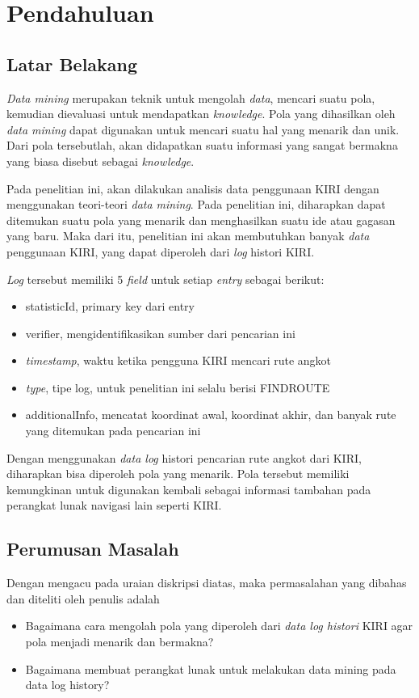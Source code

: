 \chapter{Pendahuluan}
\label{chap:intro}

\section{Latar Belakang}
\label{sec:motivation}

\textsl{Data mining} merupakan teknik untuk mengolah \textsl{data}, mencari suatu pola, kemudian dievaluasi untuk mendapatkan \textsl{knowledge}. Pola yang dihasilkan oleh \textsl{data mining} dapat digunakan untuk mencari suatu hal yang menarik dan unik. Dari pola tersebutlah, akan didapatkan suatu informasi yang sangat bermakna yang biasa disebut sebagai \textsl{knowledge}.

Pada penelitian ini, akan dilakukan analisis data penggunaan KIRI dengan menggunakan teori-teori \textsl{data mining}. Pada penelitian ini, diharapkan dapat ditemukan suatu pola yang menarik dan menghasilkan suatu ide atau gagasan yang baru. Maka dari itu, penelitian ini akan membutuhkan banyak \textsl{data} penggunaan KIRI, yang dapat diperoleh dari \textsl{log} histori KIRI.

\textsl{Log} tersebut memiliki 5 \textsl{field} untuk setiap \textsl{entry} sebagai berikut:
\begin{itemize}
	\item statisticId, primary key dari entry
	\item verifier, mengidentifikasikan sumber dari pencarian ini
	\item \textsl{timestamp}, waktu ketika pengguna KIRI mencari rute angkot
	\item \textsl{type}, tipe log, untuk penelitian ini selalu berisi FINDROUTE
	\item additionalInfo, mencatat koordinat awal, koordinat akhir, dan banyak rute yang ditemukan pada pencarian ini
\end{itemize}

Dengan menggunakan \textsl{data log} histori pencarian rute angkot dari KIRI, diharapkan bisa diperoleh pola yang menarik. Pola tersebut memiliki kemungkinan untuk digunakan kembali sebagai informasi tambahan pada perangkat lunak navigasi lain seperti KIRI.

\section{Perumusan Masalah}
Dengan mengacu pada uraian diskripsi diatas, maka permasalahan yang dibahas dan diteliti oleh penulis adalah
\begin{itemize}
	\item Bagaimana cara mengolah pola yang diperoleh dari \textsl{data log histori}  KIRI agar pola menjadi menarik dan bermakna?
	\item Bagaimana membuat perangkat lunak untuk melakukan data mining pada data log history?
\end{itemize}

